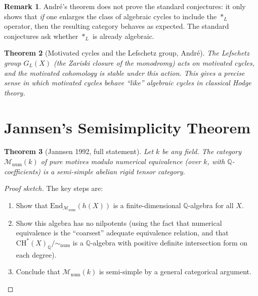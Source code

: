 \documentclass[12pt,a4paper]{amsart}
\newtheorem{theorem}{Theorem}[section]
\theoremstyle{definition}
\newtheorem{remark}[theorem]{Remark}
\newcommand{\Q}{\mathbb{Q}}
\newcommand{\End}{\mathrm{End}}
\newcommand{\CH}{\mathrm{CH}}
\begin{document}
\begin{remark}
Andr\'e's theorem does not prove the standard conjectures: it only shows that
\emph{if} one enlarges the class of algebraic cycles to include the $*_L$
operator, then the resulting category behaves as expected.  The standard
conjectures ask whether $*_L$ is already algebraic.
\end{remark}

\begin{theorem}[Motivated cycles and the Lefschetz group, Andr\'{e}]
The Lefschetz group $G_L(X)$ (the Zariski closure of the monodromy) acts on
motivated cycles, and the motivated cohomology is stable under this action.
This gives a precise sense in which motivated cycles behave ``like''
algebraic cycles in classical Hodge theory.
\end{theorem}

\section{Jannsen's Semisimplicity Theorem}\label{sec:jannsen}

\begin{theorem}[Jannsen 1992, full statement]\label{thm:jannsen_full}
Let $k$ be any field.  The category $\mathcal{M}_{\mathrm{num}}(k)$ of pure
motives modulo numerical equivalence (over $k$, with $\Q$-coefficients) is a
semi-simple abelian rigid tensor category.
\end{theorem}

\begin{proof}[Proof sketch]
The key steps are:
\begin{enumerate}[label=(\arabic*)]
  \item Show that $\End_{\mathcal{M}_{\mathrm{num}}}(h(X))$ is a
        finite-dimensional $\Q$-algebra for all $X$.
  \item Show this algebra has no nilpotents (using the fact that numerical
        equivalence is the ``coarsest'' adequate equivalence relation, and
        that $\CH^*(X)_\Q/{\sim_{\mathrm{num}}}$ is a $\Q$-algebra with positive
        definite intersection form on each degree).
  \item Conclude that $\mathcal{M}_{\mathrm{num}}(k)$ is semi-simple by a
        general categorical argument.
\end{enumerate}
\end{proof}
\end{document}
